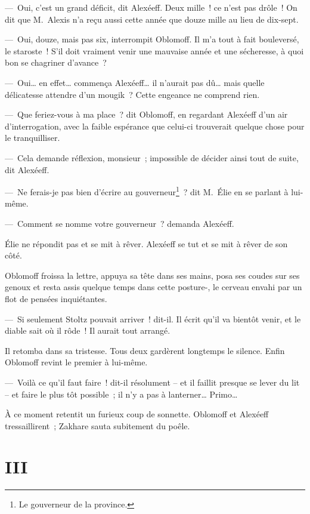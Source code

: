 \documentclass[french,twoside]{book} %
\begin{document}
— Oui, c’est un grand déficit, dit Alexéeff. Deux mille ! ce n’est pas drôle ! On dit que M. Alexis n’a reçu aussi cette année que douze mille au lieu de dix-sept.\par
— Oui, douze, mais pas six, interrompit Oblomoff. Il m’a tout à fait bouleversé, le staroste ! S’il doit vraiment venir une mauvaise année et une sécheresse, à quoi bon se chagriner d’avance ?\par
— Oui… en effet… commença Alexéeff… il n’aurait pas dû… mais quelle délicatesse attendre d’un mougik ? Cette engeance ne comprend rien.\par
— Que feriez-vous à ma place ? dit Oblomoff, en regardant Alexéeff d’un air d’interrogation, avec la faible espérance que celui-ci trouverait quelque chose pour le tranquilliser.\par
— Cela demande réflexion, monsieur ; impossible de décider ainsi tout de suite, dit Alexéeff.\par
— Ne ferais-je pas bien d’écrire au gouverneur\footnote{Le gouverneur de la province.} ? dit M. Élie en se parlant à lui-même.\par
— Comment se nomme votre gouverneur ? demanda Alexéeff.\par
Élie ne répondit pas et se mit à rêver. Alexéeff se tut et se mit à rêver de son côté.\par
Oblomoff froissa la lettre, appuya sa tête dans ses mains, posa ses coudes sur ses genoux et resta assis quelque temps dans cette posture-, le cerveau envahi par un flot de pensées inquiétantes.\par
— Si seulement Stoltz pouvait arriver ! dit-il. Il écrit qu’il va bientôt venir, et le diable sait où il rôde ! Il aurait tout arrangé.\par
Il retomba dans sa tristesse. Tous deux gardèrent longtemps le silence. Enfin Oblomoff revint le premier à lui-même.\par
— Voilà ce qu’il faut faire ! dit-il résolument – et il faillit presque se lever du lit – et faire le plus tôt possible ; il n’y a pas à lanterner… Primo…\par
À ce moment retentit un furieux coup de sonnette. Oblomoff et Alexéeff tressaillirent ; Zakhare sauta subitement du poêle.
\section[{III}]{III}\renewcommand{\leftmark}{III}
\end{document}
